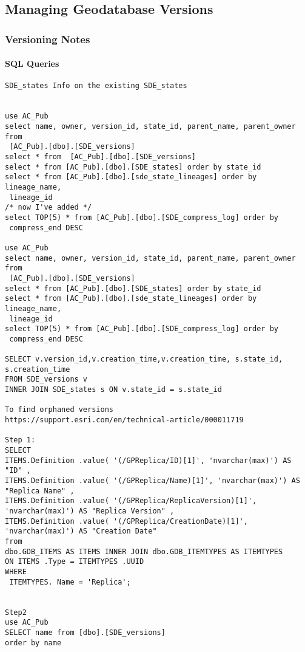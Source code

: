 \documentclass[class=article , crop=false, titlepage, twoside, multi={itemize, figure, verbatim}, float=false]{standalone}
\title{}  %
\begin{document}


\ifstandalone
\maketitle %
\tableofcontents %
\clearpage
\fi

\subsection{Managing Geodatabase Versions}
\medskip 
\subsubsection[Versioning Notes]{\Large Versioning Notes}


\paragraph{SQL Queries \texorpdfstring{\\}{}}
\begin{verbatim}
SDE_states Info on the existing SDE_states


use AC_Pub
select name, owner, version_id, state_id, parent_name, parent_owner from
 [AC_Pub].[dbo].[SDE_versions]
select * from  [AC_Pub].[dbo].[SDE_versions]
select * from [AC_Pub].[dbo].[SDE_states] order by state_id
select * from [AC_Pub].[dbo].[sde_state_lineages] order by lineage_name,
 lineage_id
/* now I've added */
select TOP(5) * from [AC_Pub].[dbo].[SDE_compress_log] order by
 compress_end DESC

use AC_Pub
select name, owner, version_id, state_id, parent_name, parent_owner from
 [AC_Pub].[dbo].[SDE_versions]
select * from [AC_Pub].[dbo].[SDE_states] order by state_id
select * from [AC_Pub].[dbo].[sde_state_lineages] order by lineage_name,
 lineage_id
select TOP(5) * from [AC_Pub].[dbo].[SDE_compress_log] order by
 compress_end DESC
 
SELECT v.version_id,v.creation_time,v.creation_time, s.state_id, s.creation_time
FROM SDE_versions v
INNER JOIN SDE_states s ON v.state_id = s.state_id 
 
To find orphaned versions 
https://support.esri.com/en/technical-article/000011719

Step 1:
SELECT
ITEMS.Definition .value( '(/GPReplica/ID)[1]', 'nvarchar(max)') AS "ID" ,
ITEMS.Definition .value( '(/GPReplica/Name)[1]', 'nvarchar(max)') AS "Replica Name" ,
ITEMS.Definition .value( '(/GPReplica/ReplicaVersion)[1]', 'nvarchar(max)') AS "Replica Version" ,
ITEMS.Definition .value( '(/GPReplica/CreationDate)[1]', 'nvarchar(max)') AS "Creation Date"
from 
dbo.GDB_ITEMS AS ITEMS INNER JOIN dbo.GDB_ITEMTYPES AS ITEMTYPES
ON ITEMS .Type = ITEMTYPES .UUID
WHERE
 ITEMTYPES. Name = 'Replica';


Step2
use AC_Pub
SELECT name from [dbo].[SDE_versions]
order by name 
\end{verbatim}
\end{document}
